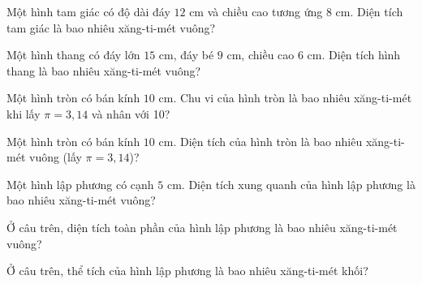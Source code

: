 
\begin{ex}
  Một hình tam giác có độ dài đáy $12\text{ cm}$ và chiều cao tương ứng $8\text{ cm}$. Diện tích tam giác là bao nhiêu xăng-ti-mét vuông?
\end{ex}

\begin{ex}
  Một hình thang có đáy lớn $15\text{ cm}$, đáy bé $9\text{ cm}$, chiều cao $6\text{ cm}$. Diện tích hình thang là bao nhiêu xăng-ti-mét vuông?
\end{ex}

\begin{ex}
  Một hình tròn có bán kính $10\text{ cm}$. Chu vi của hình tròn là bao nhiêu xăng-ti-mét khi lấy $\pi = 3{,}14$ và nhân với 10?
\end{ex}

\begin{ex}
  Một hình tròn có bán kính $10\text{ cm}$. Diện tích của hình tròn là bao nhiêu xăng-ti-mét vuông (lấy $\pi = 3{,}14$)?
\end{ex}

\begin{ex}
  Một hình lập phương có cạnh $5\text{ cm}$. Diện tích xung quanh của hình lập phương là bao nhiêu xăng-ti-mét vuông?
\end{ex}

\begin{ex}
  Ở câu trên, diện tích toàn phần của hình lập phương là bao nhiêu xăng-ti-mét vuông?
\end{ex}

\begin{ex}
  Ở câu trên, thể tích của hình lập phương là bao nhiêu xăng-ti-mét khối?
\end{ex}

